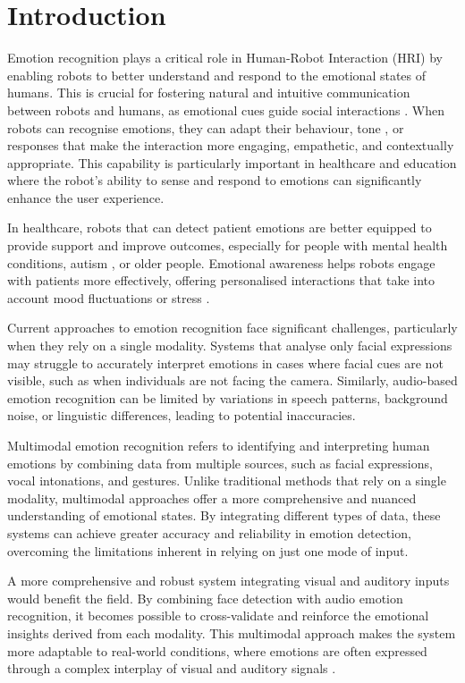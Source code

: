 \chapter{Introduction}

Emotion recognition plays a critical role in Human-Robot Interaction (HRI) by enabling robots to better understand and respond to the emotional states of humans. This is crucial for fostering natural and intuitive communication between robots and humans, as emotional cues guide social interactions \cite{Castellano2009-cv}. When robots can recognise emotions, they can adapt their behaviour, tone \cite{Breazeal2003-sa}, or responses that make the interaction more engaging, empathetic, and contextually appropriate. This capability is particularly important in healthcare and education where the robot’s ability to sense and respond to emotions can significantly enhance the user experience.

In healthcare, robots that can detect patient emotions are better equipped to provide support and improve outcomes, especially for people with mental health conditions, autism \cite{Dautenhahn2007-wl}, or older people. Emotional awareness helps robots engage with patients more effectively, offering personalised interactions that take into account mood fluctuations or stress \cite{Dhuheir2021-ii}.

Current approaches to emotion recognition face significant challenges, particularly when they rely on a single modality. Systems that analyse only facial expressions may struggle to accurately interpret emotions in cases where facial cues are not visible, such as when individuals are not facing the camera. Similarly, audio-based emotion recognition can be limited by variations in speech patterns, background noise, or linguistic differences, leading to potential inaccuracies.

Multimodal emotion recognition refers to identifying and interpreting human emotions by combining data from multiple sources, such as facial expressions, vocal intonations, and gestures. Unlike traditional methods that rely on a single modality, multimodal approaches offer a more comprehensive and nuanced understanding of emotional states. By integrating different types of data, these systems can achieve greater accuracy and reliability in emotion detection, overcoming the limitations inherent in relying on just one mode of input.

A more comprehensive and robust system integrating visual and auditory inputs would benefit the field. By combining face detection with audio emotion recognition, it becomes possible to cross-validate and reinforce the emotional insights derived from each modality. This multimodal approach makes the system more adaptable to real-world conditions, where emotions are often expressed through a complex interplay of visual and auditory signals \cite{R2024-jk}.

